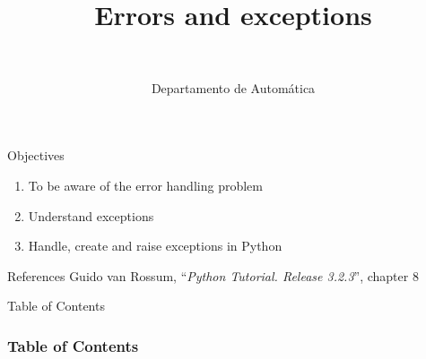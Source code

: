 \documentclass[10pt,compress]{beamer} %
\title[Errors and exceptions]{Errors and exceptions}
\author{\asignatura\\\carrera}
\institute{}
\date{Departamento de Automática}
\begin{document}
{\titlepageBlue
    \begin{frame}
        \titlepage
    \end{frame}
}

\institute{\asignatura}

\begin{frame}[plain]{}
	\begin{block}{Objectives}
		\begin{enumerate}
		\item To be aware of the error handling problem
		\item Understand exceptions
		\item Handle, create and raise exceptions in Python
		\end{enumerate}
	\end{block}

	\begin{block}{References}
		Guido van Rossum, ``\textit{Python Tutorial. Release 3.2.3}'', chapter 8
	\end{block}
\end{frame}

{
\begin{frame}[shrink]{Table of Contents}
 \frametitle{Table of Contents}
 \tableofcontents
\end{frame}
}
\end{document}
